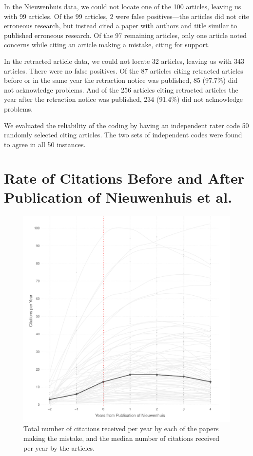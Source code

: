 \documentclass[12pt, letterpaper]{article}
\begin{document}
In the Nieuwenhuis data, we could not locate one of the 100 articles, leaving us with 99 articles. Of the 99 articles, 2 were false positives---the articles did not cite erroneous research, but instead cited a paper with authors and title similar to published erroneous research. Of the 97 remaining articles, only one article noted concerns while citing an article making a mistake, citing \citet{nieuwenhuis2011} for support. 

In the retracted article data, we could not locate 32 articles, leaving us with 343 articles. There were no false positives. Of the 87 articles citing retracted articles before or in the same year the retraction notice was published, 85 (97.7\%) did not acknowledge problems. And of the 256 articles citing retracted articles the year after the retraction notice was published, 234 (91.4\%) did not acknowledge problems.

We evaluated the reliability of the coding by having an independent rater code 50 randomly selected citing articles. The two sets of independent codes were found to agree in all 50 instances.

\clearpage

\section{Rate of Citations Before and After Publication of Nieuwenhuis et al.}

\begin{figure}[H]
\centering
\includegraphics[scale=.7]{../figs/nw_median_growth_curve.pdf}
\caption{Total number of citations received per year by each of the papers making the mistake, and the median number of citations received per year by the articles.}
\label{fig:median_niewenhuis}
\end{figure}
\end{document}
